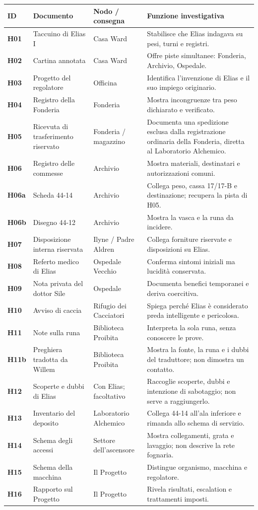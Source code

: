 \documentclass[11pt,a4paper]{article}
\begin{document}
\scriptsize
\renewcommand{\arraystretch}{1.05}
\begin{longtable}{>{\bfseries}p{8mm}p{39mm}p{31mm}p{72mm}}
\toprule
ID & Documento & Nodo / consegna & Funzione investigativa \\
\midrule
H01 & Taccuino di Elias I & Casa Ward & Stabilisce che Elias indagava su pesi, turni e registri. \\
H02 & Cartina annotata & Casa Ward & Offre piste simultanee: Fonderia, Archivio, Ospedale. \\
H03 & Progetto del regolatore & Officina & Identifica l'invenzione di Elias e il suo impiego originario. \\
H04 & Registro della Fonderia & Fonderia & Mostra incongruenze tra peso dichiarato e verificato. \\
H05 & Ricevuta di trasferimento riservato & Fonderia / magazzino & Documenta una spedizione esclusa dalla registrazione ordinaria della Fonderia, diretta al Laboratorio Alchemico. \\
H06 & Registro delle commesse & Archivio & Mostra materiali, destinatari e autorizzazioni comuni. \\
H06a & Scheda 44-14 & Archivio & Collega peso, cassa 17/17-B e destinazione; recupera la pista di H05. \\
H06b & Disegno 44-12 & Archivio & Mostra la vasca e la runa da incidere. \\
H07 & Disposizione interna riservata & Ilyne / Padre Aldren & Collega forniture riservate e disposizioni su Elias. \\
H08 & Referto medico di Elias & Ospedale Vecchio & Conferma sintomi iniziali ma lucidità conservata. \\
H09 & Nota privata del dottor Sile & Ospedale & Documenta benefici temporanei e deriva coercitiva. \\
H10 & Avviso di caccia & Rifugio dei Cacciatori & Spiega perché Elias è considerato preda intelligente e pericolosa. \\
H11 & Note sulla runa & Biblioteca Proibita & Interpreta la sola runa, senza conoscere le prove. \\
H11b & Preghiera tradotta da Willem & Biblioteca Proibita & Mostra la fonte, la runa e i dubbi del traduttore; non dimostra un contatto. \\
H12 & Scoperte e dubbi di Elias & Con Elias; facoltativo & Raccoglie scoperte, dubbi e intenzione di sabotaggio; non serve a raggiungerlo. \\
H13 & Inventario del deposito & Laboratorio Alchemico & Collega 44-14 all'ala inferiore e rimanda allo schema di servizio. \\
H14 & Schema degli accessi & Settore dell'ascensore & Mostra collegamenti, grata e lavaggio; non descrive la rete fognaria. \\
H15 & Schema della macchina & Il Progetto & Distingue organismo, macchina e regolatore. \\
H16 & Rapporto sul Progetto & Il Progetto & Rivela risultati, escalation e trattamenti imposti. \\
\bottomrule
\end{longtable}
\normalsize
\end{document}
